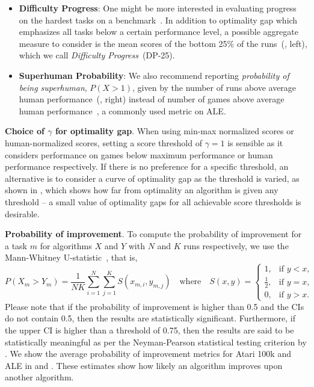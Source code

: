 \begin{itemize}
    \item \textbf{Difficulty Progress}: One might be more interested in evaluating progress on the hardest tasks on a benchmark~\citep{badia2020agent57}. In addition to optimality gap which emphasizes all tasks below a certain performance level, a possible aggregate measure to consider is the mean scores of the bottom 25\% of the runs~(, left), which we call \emph{Difficulty Progress}~(DP-25).
    \item \textbf{Superhuman Probability}: We also recommend reporting \emph{probability of being superhuman}, $P(X>1)$, given by the number of runs above average human performance~(, right) instead of number of games above average human performance~\citep{hessel2018rainbow, schwarzer2021dataefficient}, a commonly used metric on ALE. 
\end{itemize}

\textbf{Choice of $\gamma$ for optimality gap}. When using min-max normalized scores or human-normalized scores, setting a score threshold of $\gamma=1$ is sensible as it considers performance on games below maximum performance or human performance respectively. If there is no preference for a specific threshold, an alternative is to consider a curve of optimality gap as the threshold is varied, as shown in , which shows how far from optimality an algorithm is given any threshold -- a small value of optimality gaps for all achievable score thresholds is desirable.



\textbf{Probability of improvement}. To compute the probability of improvement for a task $m$ for algorithms $X$ and $Y$ with $N$ and $K$ runs respectively, we use the Mann-Whitney U-statistic~\citep{mann1947test}, that is, 
\begin{equation}
   P(X_m > Y_m) = \frac{1}{NK} \sum_{i=1}^{N}\sum_{j=1}^{K}S(x_{m,i}, y_{m, j})\quad \text{where}\quad
S(x,y)={\begin{cases}1,&{\text{if }}y<x,\\{\tfrac {1}{2}},&{\text{if }}y=x,\\0,&{\text{if }}y>x.\end{cases}}\label{eq:prob_improve}
\end{equation}
Please note that if the probability of improvement is higher than 0.5 and the CIs do not contain 0.5, then the results are statistically significant. Furthermore,
if the upper CI is higher than a threshold of 0.75, then the results are said to be statistically meaningful as per the Neyman-Pearson statistical testing criterion by \citet{bouthillier2021accounting}. We show the average probability of improvement metrics for Atari 100k and ALE in  and . These estimates show how likely an algorithm improves upon another algorithm. 

